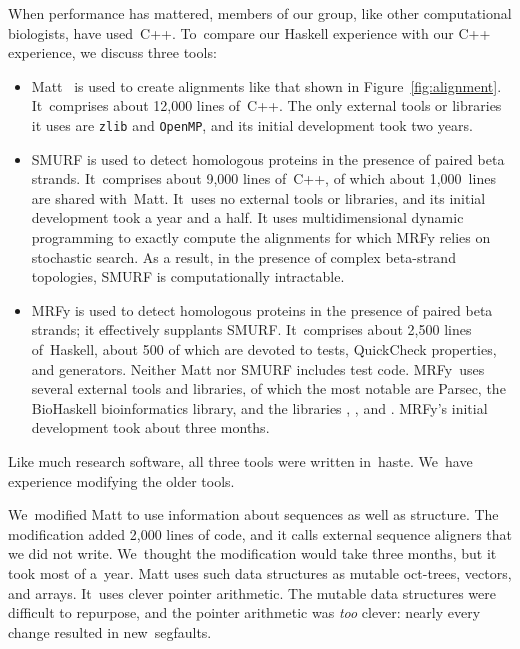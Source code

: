 \documentclass[]{jfp1}
\newcommand\mrfy{MRFy} %
\newcommand\figref[1]{Figure~\ref{fig:#1}}
\let\cite\citep
\begin{document}
When performance has mattered, members of our group, like other
computational biologists, have used~C++.
To~compare our Haskell experience with our C++ experience,
we discuss three tools:
\begin{itemize}
\item
Matt~\cite{Menke:2008wu} is used to create alignments like that shown
in \figref{alignment}.
It~comprises about 12,000 lines of~C++.
The only external tools or libraries it uses are \texttt{zlib}
and \texttt{OpenMP}, and its initial development took two years.
\item
SMURF
\cite{Menke:2010ti} is used to detect homologous proteins in the presence
of paired beta strands.
It~comprises about 9,000 lines of~C++, of which about 1,000~lines are
shared with~Matt.
It~uses no external tools or libraries, and
its initial development took a year and a half.
It uses multidimensional dynamic programming to exactly compute the alignments
for which MRFy relies on stochastic search.
As a result, in the presence of complex beta-strand topologies, SMURF is
computationally intractable.
\item
MRFy is used to detect homologous proteins in the presence of paired
beta strands; it effectively supplants SMURF.
It~comprises about 2,500 lines of~Haskell, about 500 of which are devoted
to tests, QuickCheck properties, and generators.
Neither Matt nor SMURF includes test code.
MRFy~uses several external tools and libraries, of which the most
notable are Parsec, the BioHaskell bioinformatics library, and
the libraries , ,
and .
\mrfy's initial development took about three months.
{\ifpagetuning{} \par\fi}
\end{itemize}
Like much research software, all three tools were written
 in~haste.
We~have experience modifying the older tools.



We~modified Matt to use information about sequences as well as structure.
The modification added 2,000 lines of code, and it calls
external sequence aligners that we did not write.
We~thought the modification would take three months, 
but it took most of a~year.
Matt uses such
data structures as mutable oct-trees, vectors, and arrays.
It~uses clever pointer arithmetic.
The mutable data structures were difficult to 
repurpose, and the pointer arithmetic was \emph{too} clever: 
nearly every change resulted in new~segfaults.
{\ifpagetuning{} \par\fi}
\end{document}
